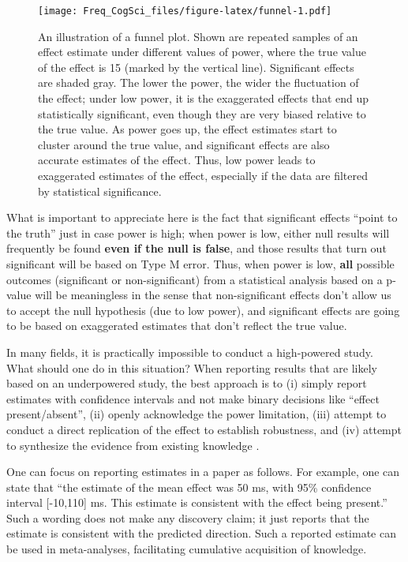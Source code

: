 \documentclass[
  12pt,
]{krantz}
\theoremstyle{definition}
\theoremstyle{definition}
\theoremstyle{definition}
\theoremstyle{definition}
\theoremstyle{remark}
\begin{document}
\begin{figure}
\centering
\texttt{[image: Freq\_CogSci\_files/figure-latex/funnel-1.pdf]}
\caption{\label{fig:funnel}An illustration of a funnel plot. Shown are repeated samples of an effect estimate under different values of power, where the true value of the effect is 15 (marked by the vertical line). Significant effects are shaded gray. The lower the power, the wider the fluctuation of the effect; under low power, it is the exaggerated effects that end up statistically significant, even though they are very biased relative to the true value. As power goes up, the effect estimates start to cluster around the true value, and significant effects are also accurate estimates of the effect. Thus, low power leads to exaggerated estimates of the effect, especially if the data are filtered by statistical significance.}
\end{figure}

What is important to appreciate here is the fact that significant effects ``point to the truth'' just in case power is high; when power is low, either null results will frequently be found \textbf{even if the null is false}, and those results that turn out significant will be based on Type M error. Thus, when power is low, \textbf{all} possible outcomes (significant or non-significant) from a statistical analysis based on a p-value will be meaningless in the sense that non-significant effects don't allow us to accept the null hypothesis (due to low power), and significant effects are going to be based on exaggerated estimates that don't reflect the true value.

In many fields, it is practically impossible to conduct a high-powered study. What should one do in this situation? When reporting results that are likely based on an underpowered study, the best approach is to (i) simply report estimates with confidence intervals and not make binary decisions like ``effect present/absent'', (ii) openly acknowledge the power limitation, (iii) attempt to conduct a direct replication of the effect to establish robustness, and (iv) attempt to synthesize the evidence from existing knowledge \citep{cumming2014new}.

One can focus on reporting estimates in a paper as follows. For example, one can state that ``the estimate of the mean effect was 50 ms, with 95\% confidence interval {[}-10,110{]} ms. This estimate is consistent with the effect being present.'' Such a wording does not make any discovery claim; it just reports that the estimate is consistent with the predicted direction. Such a reported estimate can be used in meta-analyses, facilitating cumulative acquisition of knowledge.
\end{document}
